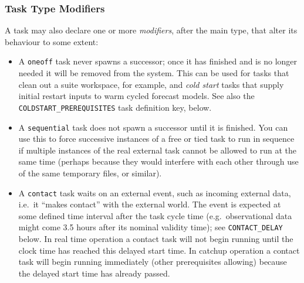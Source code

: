 \documentclass[11pt,a4paper]{article}
\begin{document}
\subsubsection{Task Type Modifiers} 

A task may also declare one or more {\em modifiers}, after the main
type, that alter its behaviour to some extent:

\begin{itemize}
    \item A \lstinline=oneoff= task never spawns a successor; once it
        has finished and is no longer needed it will be removed from the
        system. This can be used for tasks that clean out a suite 
        workspace, for example, and {\em cold start} tasks that supply
        initial restart inputs to warm cycled forecast models. See also
        the \lstinline=COLDSTART_PREREQUISITES= task definition key, below.

    \item A \lstinline=sequential= task does not spawn a successor until it is
        finished. You can use this to force successive instances of a
        free or tied task to run in sequence if multiple instances of
        the real external task cannot be allowed to run at the same
        time (perhaps because they would interfere with each other
        through use of the same temporary files, or similar).

    \item A \lstinline=contact= task waits on an external event, such as
        incoming external data, i.e.\ it ``makes contact'' with the
        external world.  The event is expected at some defined time
        interval after the task cycle time (e.g.\ observational data
        might come 3.5 hours after its nominal validity time); see
        \lstinline=CONTACT_DELAY= below. In real time operation a contact task will
        not begin running until the clock time has reached this delayed
        start time. In catchup operation a contact task will begin
        running immediately (other prerequisites allowing) because the
        delayed start time has already passed.  
        



\end{itemize}
\end{document}
